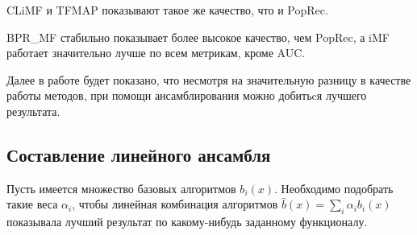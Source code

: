 \documentclass[14pt]{extarticle}
\begin{document}
\begin{table}[H]
\caption{Набор данных Movie Lens 1m}
\label{tab:2comp4}
\end{table}

CLiMF и TFMAP показывают такое же качество, что и PopRec. 

BPR\_MF стабильно показывает более высокое качество, чем PopRec, а iMF  работает значительно лучше по всем метрикам, кроме AUC. 

Далее в работе будет показано, что несмотря на значительную разницу в качестве работы методов, при помощи ансамблирования можно добитьcя лучшего результата.


\subsection{Составление линейного  ансамбля}


Пусть имеется множество базовых алгоритмов $b_i(x)$. Необходимо подобрать такие веса $\alpha_i$, чтобы линейная комбинация алгоритмов $\hat{b}(x) = \sum_i \alpha_i b_i(x)$ показывала лучший результат по какому-нибудь заданному функционалу. 
\end{document}
